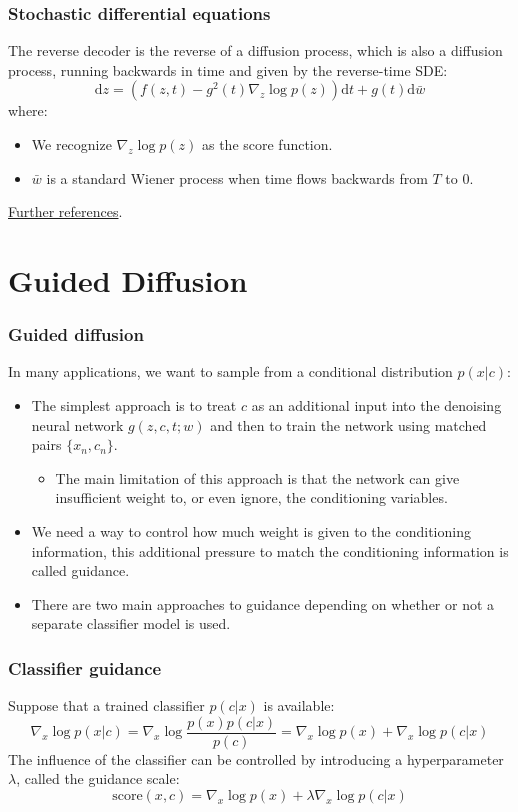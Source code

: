 \documentclass{beamer}
\begin{document}
\begin{frame}
    \frametitle{Stochastic differential equations}
    The reverse decoder is the reverse of a diffusion process, which is also a diffusion process, running backwards in time and given by the reverse-time SDE:
    \begin{equation*}
        \mathrm{d}z=(f(z,t)-g^{2}(t)\nabla_{z}\log{}p(z))\mathrm{d}t+g(t)\mathrm{d}\bar{w}
    \end{equation*}
    where:
    \begin{itemize}
        \item We recognize $\nabla_{z}\log{}p(z)$ as the score function.
        \item $\bar{w}$ is a standard Wiener process when time flows backwards from $T$ to $0$.
    \end{itemize}
    \href{https://arxiv.org/pdf/2011.13456}{Further references}.
\end{frame}

\section{Guided Diffusion}

\begin{frame}
    \frametitle{Guided diffusion}
    In many applications, we want to sample from a conditional distribution $p(x|c)$:
    \begin{itemize}
        \item The simplest approach is to treat $c$ as an additional input into the denoising neural network $g(z,c,t;w)$ and then to train the network using matched pairs $\{x_{n},c_{n}\}$.
        \begin{itemize}
            \item The main limitation of this approach is that the network can give insufficient weight to, or even ignore, the conditioning variables.
        \end{itemize}
        \item We need a way to control how much weight is given to the conditioning information, this additional pressure to match the conditioning information is called guidance.
        \item There are two main approaches to guidance depending on whether or not a separate classifier model is used.
    \end{itemize}
\end{frame}

\begin{frame}
    \frametitle{Classifier guidance}
    Suppose that a trained classifier $p(c|x)$ is available:
    \begin{equation*}
        \nabla_{x}\log{}p(x|c)=\nabla_{x}\log\frac{p(x)p(c|x)}{p(c)}=\nabla_{x}\log{}p(x)+\nabla_{x}\log{}p(c|x)
    \end{equation*}
    The influence of the classifier can be controlled by introducing a hyperparameter $\lambda$, called the guidance scale:
    \begin{equation*}
        \mathrm{score}(x,c)=\nabla_{x}\log{}p(x)+\lambda\nabla_{x}\log{}p(c|x)
    \end{equation*}
\end{frame}
\end{document}

